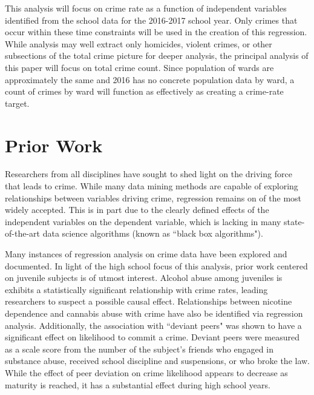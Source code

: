 \documentclass[12pt]{article}
\begin{document}
\par

This analysis will focus on crime rate as a function of independent variables identified from the school data for the 2016-2017 school year.  Only crimes that occur within these time constraints will be used in the creation of this regression.  While analysis may well extract only homicides, violent crimes, or other subsections of the total crime picture for deeper analysis, the principal analysis of this paper will focus on total crime count.  Since population of wards are approximately the same and 2016 has no concrete population data by ward, a count of crimes by ward will function as effectively as creating a crime-rate target.

	\section{Prior Work}

Researchers from all disciplines have sought to shed light on the driving force that leads to crime.  While many data mining methods are capable of exploring relationships between variables driving crime, regression remains on of the most widely accepted.\cite{kaur}  This is in part due to the clearly defined effects of the independent variables on the dependent variable, which is lacking in many state-of-the-art data science algorithms (known as ``black box algorithms").

\par

Many instances of regression analysis on crime data have been explored and documented.  In light of the high school focus of this analysis, prior work centered on juvenile subjects is of utmost interest.  Alcohol abuse among juveniles is exhibits a statistically significant relationship with crime rates, leading researchers to suspect a possible causal effect.\cite{fergusson}  Relationships between nicotine dependence and cannabis abuse with crime have also be identified via regression analysis.\cite{ferg2}  Additionally, the association with ``deviant peers" was shown to have a significant effect on likelihood to commit a crime.  Deviant peers were measured as a scale score from the number of the subject's friends who engaged in substance abuse, received school discipline and suspensions, or who broke the law.  While the effect of peer deviation on crime likelihood appears to decrease as maturity is reached, it has a substantial effect during high school years.\cite{ferg2}
\end{document}
